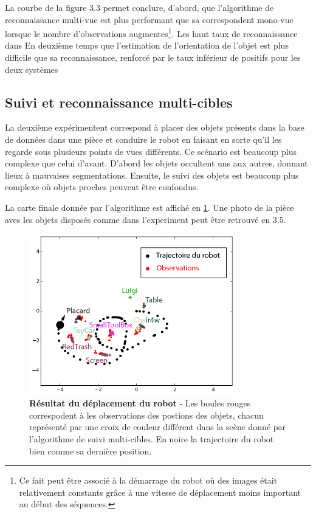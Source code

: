 La courbe de la figure 3.3 permet conclure, d'abord, que l'algorithme de reconnaissance multi-vue est plus performant que sa correspondent mono-vue lorsque le nombre d'observations augmentes\footnote{Ce fait peut être associé à la démarrage du robot où des images était relativement constants grâce à une vitesse de déplacement moins important au début des séquences.}. Les haut taux de reconnaissance dans En deuxième temps que l'estimation de l'orientation de l'objet est plus difficile que sa reconnaissance, renforcé par le taux inférieur de positifs pour les deux systèmes



\subsection{Suivi et reconnaissance multi-cibles}

La deuxième expérimentent correspond à placer des objets présents dans la base de données dans une pièce et conduire le robot en faisant en sorte qu'il les regarde  sous plusieurs points de vues différents. Ce scénario est beaucoup plus complexe que celui d'avant. D'abord les objets occultent uns aux autres, donnant lieux à mauvaises segmentations. Ensuite, le suivi des objets est beaucoup plus complexe où objets proches peuvent être confondus.

La carte finale donnée par l'algorithme est affiché en \ref{fig:multi_map}. Une photo de la pièce aves les objets disposés comme dans l'experiment peut être retrouvé en 3.5. %

\begin{figure}[H]
	\begin{center}\includegraphics[width=0.8\textwidth]{map.png}\end{center}
	\caption{\textbf{Résultat du déplacement du robot} - Les boules rouges correspodent à les observations des postions des objets, chacun représenté par une croix de couleur différent dans la scène donné par l'algorithme de suivi multi-cibles. En noire la trajectoire du robot bien comme sa dernière position.}	
	\label{fig:multi_map}
\end{figure}

